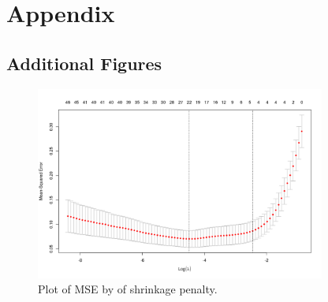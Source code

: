 \documentclass[a4paper, 10pt, titlepage]{article}
\begin{document}
\newpage

\section{Appendix}
\subsection{Additional Figures}

\begin{figure}[!ht]
	\centering
		\includegraphics[width = 0.85\textwidth]{shrinkage.png}
	\caption{Plot of MSE by of shrinkage penalty.}
\end{figure}

\clearpage
\end{document}

